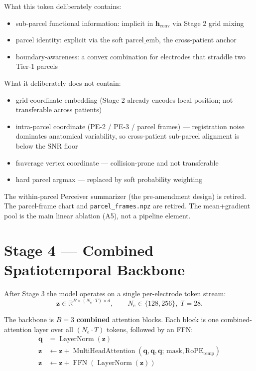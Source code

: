 \documentclass[11pt,letterpaper]{article}
\newcommand{\R}{\mathbb{R}}
\newcommand{\bz}{\mathbf{z}}
\newcommand{\bh}{\mathbf{h}}
\newcommand{\bq}{\mathbf{q}}
\begin{document}
What this token deliberately contains:
\begin{itemize}[leftmargin=2em, itemsep=0.2em]
\item sub-parcel functional information: implicit in $\bh_{\text{conv}}$ via Stage 2 grid mixing
\item parcel identity: explicit via the soft $\text{parcel\_emb}$, the cross-patient anchor
\item boundary-awareness: a convex combination for electrodes that straddle two Tier-1 parcels
\end{itemize}

What it deliberately does not contain:
\begin{itemize}[leftmargin=2em, itemsep=0.2em]
\item grid-coordinate embedding (Stage 2 already encodes local position; not transferable across patients)
\item intra-parcel coordinate (PE-2 / PE-3 / parcel frames) --- registration noise dominates anatomical variability, so cross-patient sub-parcel alignment is below the SNR floor
\item fsaverage vertex coordinate --- collision-prone and not transferable
\item hard parcel argmax --- replaced by soft probability weighting
\end{itemize}

The within-parcel Perceiver summarizer (the pre-amendment design) is retired. The parcel-frame chart and \texttt{parcel\_frames.npz} are retired. The mean+gradient pool is the main linear ablation (A5), not a pipeline element.


\section{Stage 4 --- Combined Spatiotemporal Backbone}

After Stage 3 the model operates on a single per-electrode token stream:
\begin{equation}
\bz \in \R^{B \times (N_e \cdot T) \times d},
\qquad N_e \in \{128, 256\}, \; T = 28.
\end{equation}

The backbone is $B = 3$ \textbf{combined} attention blocks. Each block is one combined-attention layer over all $(N_e \cdot T)$ tokens, followed by an FFN:
\begin{align}
\bq &= \operatorname{LayerNorm}(\bz) \\
\bz &\leftarrow \bz + \operatorname{MultiHeadAttention}(\bq, \bq, \bq;\, \text{mask}, \text{RoPE}_{\text{temp}}) \\
\bz &\leftarrow \bz + \operatorname{FFN}(\operatorname{LayerNorm}(\bz))
\end{align}
\end{document}
